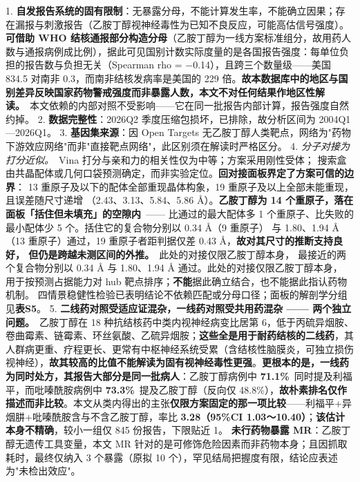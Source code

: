 \documentclass[UTF8,fontset=windows,11pt]{ctexart}
\begin{document}
1. \textbf{自发报告系统的固有限制}：无暴露分母，不能计算发生率，不能确立因果；存在漏报与刺激报告（乙胺丁醇视神经毒性为已知不良反应，可能高估信号强度）。\textbf{可借助 WHO 结核通报部分构造分母}（乙胺丁醇为一线方案标准组分，故用药人数与通报病例成比例），据此可见国别计数实际度量的是各国报告强度：每单位负担的报告数与负担无关（Spearman rho = −0.14），且跨三个数量级——美国 834.5 对南非 0.3，而南非结核发病率是美国的 229 倍。\textbf{故本数据库中的地区与国别差异反映国家药物警戒强度而非暴露人数，本文不对任何结果作地区性解读。}\ 本文依赖的内部对照不受影响——它在同一批报告内部计算，报告强度自然约掉。 2. \textbf{数据完整性}：2026Q2 季度压缩包损坏，已排除，故分析区间为 2004Q1—2026Q1。 3. \textbf{基因集来源}：因 Open Targets 无乙胺丁醇人类靶点，网络为"药物下游效应网络"而非"直接靶点网络"，此区别须在解读时严格区分。 4. \textit{分子对接为打分近似。}\ Vina 打分与亲和力的相关性仅为中等；方案采用刚性受体； 搜索盒由共晶配体或几何口袋预测确定，而非实验定位。\textbf{回对接面板界定了方案可信的边界}： 13 重原子及以下的配体全部重现晶体构象，19 重原子及以上全部未能重现，且误差随尺寸递增 （2.43、3.13、5.84、5.86 Å）。\textbf{乙胺丁醇为 14 个重原子，落在面板「括住但未填充」的空隙内}\ —— 比通过的最大配体多 1 个重原子、比失败的最小配体少 5 个。括住它的复合物分别以 0.34 Å（9 重原子） 与 1.80、1.94 Å（13 重原子）通过，19 重原子者距判据仅差 0.43 Å，\textbf{故对其尺寸的推断支持良好， 但仍是跨越未测区间的外推。}\ 此处的对接仅限乙胺丁醇本身， 最接近的两个复合物分别以 0.34 Å 与 1.80、1.94 Å 通过。此处的对接仅限乙胺丁醇本身， 用于按预测占据能力对 hub 靶点排序；\textbf{不能}据此确立结合，也不能据此指认药物机制。 四情景稳健性检验已表明结论不依赖匹配或分母口径；面板的解剖学分组见\textbf{表S5}。 5. \textbf{二线药对照受适应证混杂，一线药对照受共用药混杂 —— 两个独立问题。}\ 乙胺丁醇在 18 种抗结核药中类内视神经病变比居第 6，低于丙硫异烟胺、卷曲霉素、链霉素、环丝氨酸、乙硫异烟胺；\textbf{这些全是用于耐药结核的二线药}，其人群病更重、疗程更长、更常有中枢神经系统受累（含结核性脑膜炎，可独立损伤视神经），\textbf{故其较高的比值不能解读为固有视神经毒性更强}。\textbf{更根本的是，一线药为同时处方，其报告大部分是同一批病人}：乙胺丁醇病例中 \textbf{71.1\%}\ 同时提及利福平，而吡嗪酰胺病例中 \textbf{73.3\%}\ 提及乙胺丁醇（反向仅 48.8\%），\textbf{故朴素排名仅作描述而非比较}。本文从类内得出的主张\textbf{仅限方案固定的那一项比较}——利福平+异烟肼+吡嗪酰胺含与不含乙胺丁醇，率比 \textbf{3.28（95\%CI 1.03～10.40）}；\textbf{该估计本身不精确}，较小一组仅 845 份报告，下限贴近 1。 \textbf{未行药物暴露 MR}：乙胺丁醇无遗传工具变量，本文 MR 针对的是可修饰危险因素而非药物本身；且因抓取耗时，最终仅纳入 3 个暴露（原拟 10 个），罕见结局把握度有限，结论应表述为"未检出效应"。
\end{document}
